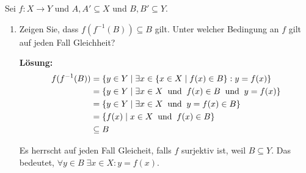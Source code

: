 \begin{imp-ex}
  Sei $f:X \to Y$ und $A, A' \subseteq X$ und $B,B' \subseteq Y$.
  \begin{enumerate}[label=(\roman*)]
    \item Zeigen Sie, dass $ f(f^{-1}(B)) \subseteq B$ gilt. Unter welcher Bedingung an $f$ gilt auf jeden Fall Gleichheit?
    
    \textbf{Lösung:} 
    \begin{equation}
      \begin{aligned}
        f(f^{-1}(B)) 
        &= \{ y \in Y \mid \exists x \in \{ x \in X \mid f(x) \in B\} : y= f(x) \} \\ 
        &= \{ y \in Y \mid \exists x \in X \;\; \text{und}\;\; f(x) \in B \;\; \text{und}\;\; y = f(x) \} \\ 
        &= \{ y \in Y \mid \exists x \in X \;\; \text{und}\;\; y = f(x) \in B  \} \\ 
        &= \{ f(x) \mid x \in X \;\; \text{und}\;\; f(x) \in B  \} \\
        & \subseteq B
      \end{aligned}
    \end{equation}
    
    Es herrscht auf jeden Fall Gleicheit, falls $f$ surjektiv ist, weil $B \subseteq Y$. Das bedeutet, $\forall y \in B \; \exists x \in X: y = f(x)$.
  \end{enumerate}
\end{imp-ex}